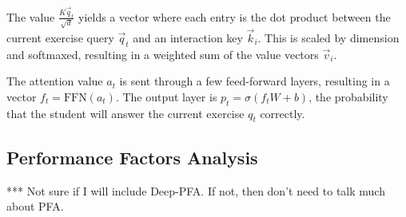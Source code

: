 The value $\frac{K \vec q_t}{\sqrt{d}}$ yields a vector where each entry is the dot product between the current exercise query $\vec q_t$ and an interaction key $\vec k_i$. This is scaled by dimension and softmaxed, resulting in a weighted sum of the value vectors $\vec v_i$.

The attention value $a_t$ is sent through a few feed-forward layers, resulting in a vector $f_t = \text{FFN}(a_t)$. The output layer is $p_t = \sigma(f_t W + b)$, the probability that the student will answer the current exercise $q_t$ correctly.


\subsection{Performance Factors Analysis}
*** Not sure if I will include Deep-PFA. If not, then don't need to talk much about PFA.


